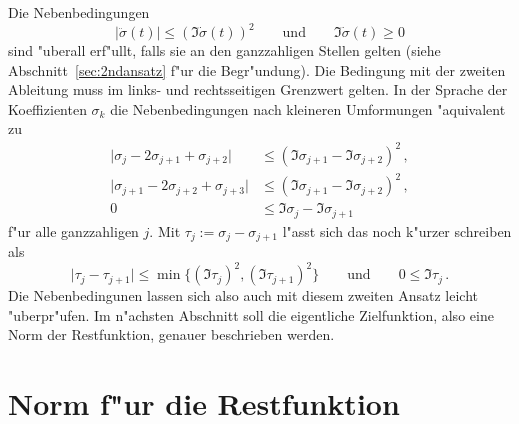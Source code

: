 \documentclass[a4paper]{scrartcl}
\begin{document}
Die Nebenbedingungen 
$$ \lvert\ddot\sigma(t)\rvert \le (\Im\dot\sigma(t))^2 
\qquad \text{und} \qquad
\Im\dot\sigma(t)\ge0 $$
sind "uberall erf"ullt, falls sie an den ganzzahligen Stellen gelten (siehe Abschnitt~\ref{sec:2ndansatz} f"ur die Begr"undung). 
Die Bedingung mit der zweiten Ableitung muss im links- und rechtsseitigen Grenzwert gelten. 
In der Sprache der Koeffizienten $\sigma_k$ die Nebenbedingungen nach kleineren Umformungen "aquivalent zu 
\begin{align*}
\lvert\sigma_j-2\sigma_{j+1}+\sigma_{j+2}\rvert 
&\le (\Im\sigma_{j+1}-\Im\sigma_{j+2})^2\,, \\
\lvert\sigma_{j+1}-2\sigma_{j+2}+\sigma_{j+3}\rvert 
&\le (\Im\sigma_{j+1}-\Im\sigma_{j+2})^2\,, \\
0&\le \Im\sigma_j-\Im\sigma_{j+1}
\end{align*}
f"ur alle ganzzahligen $j$. Mit 
$ \tau_j := \sigma_j-\sigma_{j+1} $
l"asst sich das noch k"urzer schreiben als
\begin{equation} \label{eq:condTau}
\lvert\tau_j-\tau_{j+1}\rvert \le \min\{(\Im\tau_j)^2, (\Im\tau_{j+1})^2\}
\qquad \text{und} \qquad
0\le\Im\tau_j\,.
\end{equation}
Die Nebenbedingunen lassen sich also auch mit diesem zweiten Ansatz leicht "uberpr"ufen. 
Im n"achsten Abschnitt soll die eigentliche Zielfunktion, also eine Norm der Restfunktion, genauer beschrieben werden.


\section{Norm f"ur die Restfunktion} \label{sec:norms4r}
\end{document}
